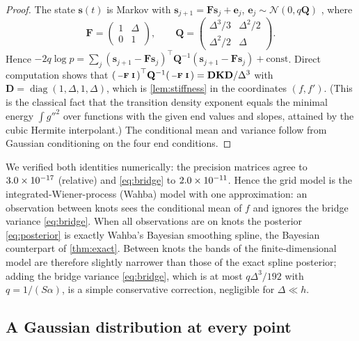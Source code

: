 \documentclass[11pt,a4paper]{article}
\theoremstyle{definition}
\theoremstyle{remark}
\newcommand{\N}{\mathcal{N}}
\newcommand{\mK}{\mathbf{K}}
\begin{document}
\begin{proof}
The state $\mathbf s(t)$ is Markov with $\mathbf s_{j+1}=\mathbf F\mathbf s_j+\mathbf e_j$, $\mathbf e_j\sim\N(0,q\mathbf Q)$ \citep{Jones1981,WeckerAnsley1983}, where
\[
\mathbf F=\begin{pmatrix}1&\Delta\\0&1\end{pmatrix},\qquad \mathbf Q=\begin{pmatrix}\Delta^3/3&\Delta^2/2\\\Delta^2/2&\Delta\end{pmatrix}.
\]
Hence $-2q\log p=\sum_j(\mathbf s_{j+1}-\mathbf F\mathbf s_j)^\top\mathbf Q^{-1}(\mathbf s_{j+1}-\mathbf F\mathbf s_j)+\text{const}$. Direct computation shows that $\begin{psmallmatrix}-\mathbf F&\mathbf I\end{psmallmatrix}^\top\mathbf Q^{-1}\begin{psmallmatrix}-\mathbf F&\mathbf I\end{psmallmatrix}=\mathbf D\mK\mathbf D/\Delta^3$ with $\mathbf D=\operatorname{diag}(1,\Delta,1,\Delta)$, which is \cref{lem:stiffness} in the coordinates $(f,f')$. (This is the classical fact that the transition density exponent equals the minimal energy $\int g''^2$ over functions with the given end values and slopes, attained by the cubic Hermite interpolant.) The conditional mean and variance follow from Gaussian conditioning on the four end conditions.
\end{proof}

We verified both identities numerically: the precision matrices agree to $3.0\times 10^{-17}$ (relative) and \eqref{eq:bridge} to $2.0\times 10^{-11}$. Hence the grid model is the integrated-Wiener-process (Wahba) model with one approximation: an observation between knots sees the conditional mean of $f$ and ignores the bridge variance \eqref{eq:bridge}. When all observations are on knots the posterior \eqref{eq:posterior} is exactly Wahba's Bayesian smoothing spline, the Bayesian counterpart of \cref{thm:exact}. Between knots the bands of the finite-dimensional model are therefore slightly narrower than those of the exact spline posterior; adding the bridge variance \eqref{eq:bridge}, which is at most $q\Delta^3/192$ with $q=1/(S\alpha)$, is a simple conservative correction, negligible for $\Delta\ll h$.

\subsection{A Gaussian distribution at every point}
\end{document}
